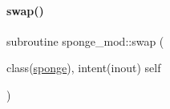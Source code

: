 \mbox{\label{namespacesponge__mod_a922500c528c801f6423fea3e7b6a8601}} 
\paragraph{\texorpdfstring{swap()}{swap()}}
{\footnotesize\ttfamily subroutine sponge\+\_\+mod\+::swap (\begin{DoxyParamCaption}\item[{class(\mbox{\hyperlink{structsponge__mod_1_1sponge}{sponge}}), intent(inout)}]{self }\end{DoxyParamCaption})\hspace{0.3cm}{\ttfamily [private]}}

